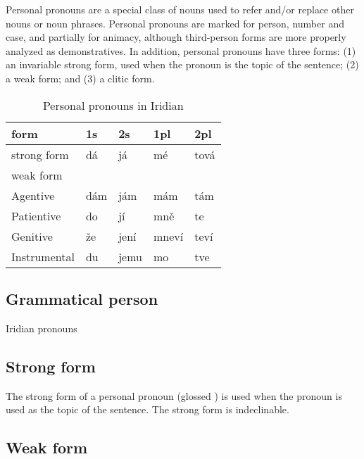Personal pronouns are a special class of nouns used to refer and/or replace other nouns or noun phrases. Personal pronouns are marked for person, number and case, and partially for animacy, although third-person forms are more properly analyzed as demonstratives. In addition, personal pronouns have three forms: (1) an invariable strong form, used when the pronoun is the topic of the sentence; (2) a weak form; and (3) a clitic form.

\begin{table}[h!]
    \footnotesize\sffamily
	\caption{Personal pronouns in Iridian}
	\medskip
	\begin{tabu} to 0.8 
		\toprule 
        {\sc form} & {\sc 1s} & {\sc 2s} & {\sc 1pl} & {\sc 2pl}\\
		\midrule
        {\sc strong form}  & dá      & já      & mé      & tová \\
        {\sc weak form}    &           &           &           & \\
        \quad Agentive      & dám     & jám     & mám     & tám\\
        \quad Patientive    & do        & jí      & mně      & te\\
        \quad Genitive      & že    & jení    & mneví   & teví\\
        \quad Instrumental  & du        & jemu      & mo        & tve\\
        \bottomrule
	\end{tabu}

\end{table}

\subsection{Grammatical person}
Iridian pronouns

\subsection{Strong form}

The strong form of a personal pronoun (glossed ) is used when the pronoun is used as the topic of the sentence. The strong form is indeclinable.

\subsection{Weak form}

